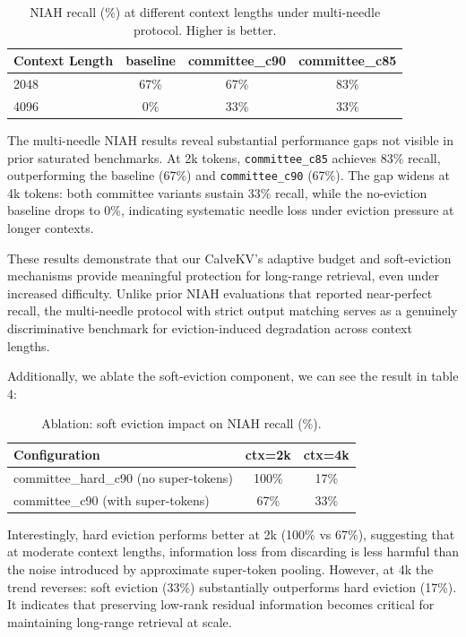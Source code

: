 \documentclass[letterpaper]{article} %
\begin{document}
\begin{table}[t]
\centering
\small
\caption{NIAH recall (\%) at different context lengths under multi-needle protocol. Higher is better.}
\label{tab:niah_main}
\begin{tabular}{lccc}
\toprule
Context Length & baseline & committee\_c90 & committee\_c85 \\
\midrule
2048 & 67\% & 67\% & 83\% \\
4096 & 0\% & 33\% & 33\% \\
\bottomrule
\end{tabular}
\end{table}

The multi-needle NIAH results reveal substantial performance gaps not visible in prior
saturated benchmarks. At 2k tokens, \texttt{committee\_c85} achieves 83\% recall, 
outperforming the baseline (67\%) and \texttt{committee\_c90} (67\%).
The gap widens at 4k tokens: both committee variants sustain 33\% recall, while
the no-eviction baseline drops to 0\%, indicating systematic needle loss under eviction
pressure at longer contexts. 

These results demonstrate that our CalveKV's adaptive budget and soft-eviction mechanisms
provide meaningful protection for long-range retrieval, even under increased difficulty.
Unlike prior NIAH evaluations that reported near-perfect recall, the multi-needle 
protocol with strict output matching serves as a genuinely discriminative benchmark
for eviction-induced degradation across context lengths.

Additionally, we ablate the soft-eviction component, we can see the result in table 4:

\begin{table}[t]
\centering
\small
\caption{Ablation: soft eviction impact on NIAH recall (\%).}
\label{tab:niah_ablation}
\begin{tabular}{lcc}
\toprule
Configuration & ctx=2k & ctx=4k \\
\midrule
committee\_hard\_c90 (no super-tokens) & 100\% & 17\% \\
committee\_c90 (with super-tokens) & 67\% & 33\% \\
\bottomrule
\end{tabular}
\end{table}

Interestingly, hard eviction performs better at 2k (100\% vs 67\%), suggesting that at moderate 
context lengths, information loss from 
discarding is less harmful than the noise introduced by approximate super-token pooling.
However, at 4k the trend reverses: soft eviction (33\%) substantially outperforms 
hard eviction (17\%). It indicates that preserving low-rank residual information becomes 
critical for maintaining long-range retrieval at scale.
\end{document}
